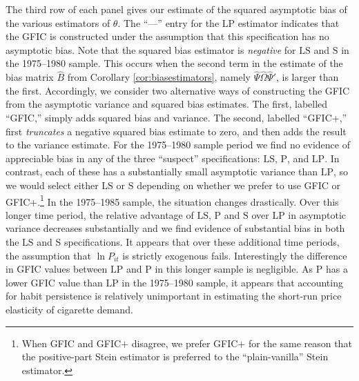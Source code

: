 The third row of each panel gives our estimate of the squared asymptotic bias of the various estimators of $\theta$.
The ``---'' entry for the $\text{LP}$ estimator indicates that the GFIC is constructed under the assumption that this specification has no asymptotic bias.
Note that the squared bias estimator is \emph{negative} for $\text{LS}$ and $\text{S}$ in the 1975--1980 sample.
This occurs when the second term in the estimate of the bias matrix $\widehat{B}$ from Corollary \ref{cor:biasestimators}, namely $\widehat{\Psi}\widehat{\Omega}\widehat{\Psi}'$, is larger than the first.
Accordingly, we consider two alternative ways of constructing the GFIC from the asymptotic variance and squared bias estimates.
The first, labelled ``GFIC,'' simply adds squared bias and variance.
The second, labelled ``GFIC+,'' first \emph{truncates} a negative squared bias estimate to zero, and then adds the result to the variance estimate.
For the 1975--1980 sample period we find no evidence of appreciable bias in any of the three ``suspect'' specifications: $\text{LS}$, $\text{P}$, and $\text{LP}$.
In contrast, each of these has a substantially small asymptotic variance than $\text{LP}$, so we would select either $\text{LS}$ or $\text{S}$ depending on whether we prefer to use GFIC or GFIC+.\footnote{When GFIC and GFIC+ disagree, we prefer GFIC+ for the same reason that the positive-part Stein estimator is preferred to the ``plain-vanilla'' Stein estimator.}
In the 1975--1985 sample, the situation changes drastically.
Over this longer time period, the relative advantage of $\text{LS}$, $\text{P}$ and $\text{S}$ over $\text{LP}$ in asymptotic variance decreases substantially and we find evidence of substantial bias in both the $\text{LS}$ and $\text{S}$ specifications.
It appears that over these additional time periods, the assumption that $\ln P_{it}$ is strictly exogenous fails.
Interestingly the difference in GFIC values between $\text{LP}$ and $\text{P}$ in this longer sample is negligible.
As $\text{P}$ has a lower GFIC value than $\text{LP}$ in the 1975--1980 sample, it appears that accounting for habit persistence is relatively unimportant in estimating the short-run price elasticity of cigarette demand.

